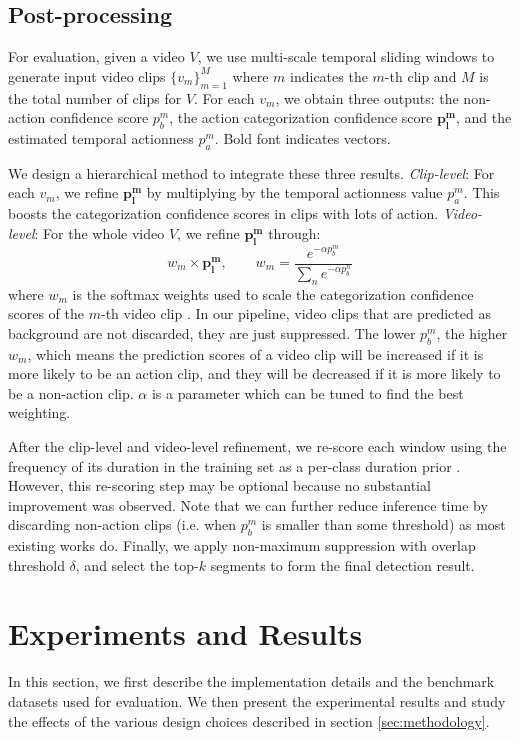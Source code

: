\documentclass[10pt,twocolumn,letterpaper]{article}
\begin{document}
\subsection{Post-processing}
For evaluation, given a video $V$,  we use multi-scale temporal sliding windows to generate input video clips $\{v_{m}\}_{m=1}^{M}$ where $m$ indicates the $m$-th clip and $M$ is the total number of clips for $V$. For each $v_{m}$, we obtain three outputs: the non-action confidence score $p_{b}^{m}$, the action categorization confidence score $\mathbf{p_{l}^{m}}$, and the estimated temporal actionness $p_{a}^{m}$. Bold font indicates vectors.

We design a hierarchical method to integrate these three results. \textit{Clip-level}: For each $v_{m}$, we refine $\mathbf{p_{l}^{m}}$ by multiplying by the temporal actionness value $p_{a}^{m}$. This boosts the categorization confidence scores in clips with lots of action. \textit{Video-level}: For the whole video $V$, we refine $\mathbf{p_{l}^{m}}$ through:
\begin{equation}
	w_{m} \times \mathbf{p_{l}^{m}}, \quad \quad w_{m} = \frac{e^{-\alpha p_{b}^{m}}}{\sum_{n} e^{-\alpha p_{b}^{n}}}
	\label{eq:softmaxWeights}
\end{equation}
where $w_{m}$ is the softmax weights used to scale the categorization confidence scores of the $m$-th video clip \cite{non_action_wang_cvpr16}. In our pipeline, video clips that are predicted as background are not discarded, they are just suppressed. The lower $p_{b}^{m}$, the higher $w_{m}$, which means the prediction scores of a video clip will be increased if it is more likely to be an action clip, and they will be decreased if it is more likely to be a non-action clip. $\alpha$ is a parameter which can be tuned to find the best weighting.

After the clip-level and video-level refinement, we re-score each window using the frequency of its duration in the training set as a per-class duration prior \cite{compact_fisher_action_oneata_iccv13}. However, this re-scoring step may be optional because no substantial improvement was observed. Note that we can further reduce inference time by discarding non-action clips (i.e. when $p_{b}^{m}$ is smaller than some threshold) as most existing works do.
Finally, we apply non-maximum suppression with overlap threshold $\delta$, and select the top-$k$ segments to form the final detection result.

\section{Experiments and Results}
\label{sec:experiments}
In this section, we first describe the implementation details and the benchmark datasets used for evaluation. We then present the experimental results and study the effects of the various design choices described in section \ref{sec:methodology}. 
\end{document}
